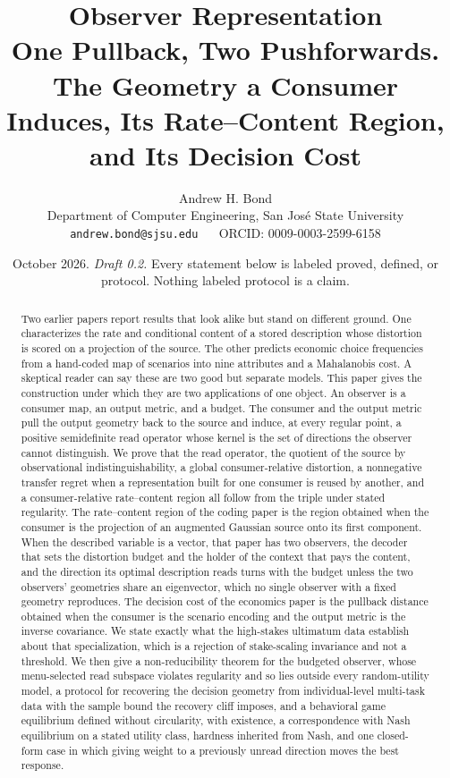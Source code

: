 \documentclass[11pt]{article}
\title{\textbf{Observer Representation}\\[4pt]
\large One Pullback, Two Pushforwards. The Geometry a Consumer Induces, Its Rate--Content Region, and Its Decision Cost}
\author{Andrew H. Bond\\
\small Department of Computer Engineering, San Jos\'e State University\\
\small \texttt{andrew.bond@sjsu.edu} ~\textbar~ ORCID: 0009-0003-2599-6158}
\date{October 2026. \emph{Draft 0.2.} Every statement below is labeled proved, defined, or protocol. Nothing labeled protocol is a claim.}
\theoremstyle{definition}
\theoremstyle{remark}
\begin{document}
\maketitle

\begin{abstract}
Two earlier papers report results that look alike but stand on different ground.
One characterizes the rate and conditional content of a stored description whose distortion is scored on a projection of the source.
The other predicts economic choice frequencies from a hand-coded map of scenarios into nine attributes and a Mahalanobis cost.
A skeptical reader can say these are two good but separate models.
This paper gives the construction under which they are two applications of one object.
An observer is a consumer map, an output metric, and a budget.
The consumer and the output metric pull the output geometry back to the source and induce, at every regular point, a positive semidefinite read operator whose kernel is the set of directions the observer cannot distinguish.
We prove that the read operator, the quotient of the source by observational indistinguishability, a global consumer-relative distortion, a nonnegative transfer regret when a representation built for one consumer is reused by another, and a consumer-relative rate--content region all follow from the triple under stated regularity.
The rate--content region of the coding paper is the region obtained when the consumer is the projection of an augmented Gaussian source onto its first component.
When the described variable is a vector, that paper has two observers, the decoder that sets the distortion budget and the holder of the context that pays the content, and the direction its optimal description reads turns with the budget unless the two observers' geometries share an eigenvector, which no single observer with a fixed geometry reproduces.
The decision cost of the economics paper is the pullback distance obtained when the consumer is the scenario encoding and the output metric is the inverse covariance.
We state exactly what the high-stakes ultimatum data establish about that specialization, which is a rejection of stake-scaling invariance and not a threshold.
We then give a non-reducibility theorem for the budgeted observer, whose menu-selected read subspace violates regularity and so lies outside every random-utility model, a protocol for recovering the decision geometry from individual-level multi-task data with the sample bound the recovery cliff imposes, and a behavioral game equilibrium defined without circularity, with existence, a correspondence with Nash equilibrium on a stated utility class, hardness inherited from Nash, and one closed-form case in which giving weight to a previously unread direction moves the best response.
\end{abstract}
\end{document}
